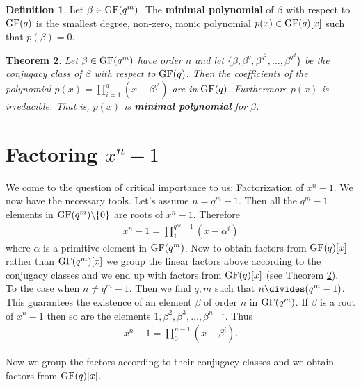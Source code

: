 \documentclass[12pt]{article}
\newtheorem{thm}{Theorem}
\theoremstyle{definition}
\newtheorem{defn}[thm]{Definition}
\newtheorem{exmp}[thm]{Example}
\begin{document}
\begin{defn}
Let $\beta\in\text{GF}(q^m)$. The \textbf{minimal polynomial} of $\beta$ with respect to $\text{GF}(q)$ is the smallest degree, non-zero, monic polynomial $p(x)\in\text{GF}(q)[x]$ such that $p(\beta)=0$.
\end{defn}

\vspace{0.1cm}
\begin{thm}
\label{Thm:MinimalPolyConjugacy}
Let $\beta\in\text{GF}(q^m)$ have order $n$ and let $\{\beta,\beta^q,\beta^{q^2},\ldots,\beta^{q^d}\}$ be the conjugacy class of $\beta$ with respect to $\text{GF}(q)$. Then the coefficients of the polynomial $p(x)=\prod_{i=1}^{d}(x-\beta^{q^i})$ are in $\text{GF}(q)$. Furthermore $p(x)$ is irreducible. That is, $p(x)$ is \textbf{minimal polynomial} for $\beta$.
\end{thm}


\section{Factoring $x^n-1$}
We come to the question of critical importance to us: Factorization of $x^n-1$. We now have the necessary tools. Let's assume $n=q^m-1.$ Then all the $q^m-1$ elements in $\text{GF}(q^m)\backslash\{0\}$ are roots of $x^n-1$. Therefore
\begin{align*}
x^n-1=\prod_{1}^{q^m-1}(x-\alpha^i)
\end{align*}
where $\alpha$ is a primitive element in $\text{GF}(q^m)$. Now to obtain factors from $\text{GF}(q)[x]$ rather than $\text{GF}(q^m)[x]$ we group the linear factors above according to the conjugacy classes and we end up with factors from $\text{GF}(q)[x]$ (see Theorem \ref{Thm:MinimalPolyConjugacy}).\\

To the case when $n\neq q^m-1$. Then we find $q,m$ such that $n\divides (q^m-1)$. This guarantees the existence of an element $\beta$ of order $n$ in $\text{GF}(q^m)$. If $\beta$ is a root of $x^n-1$ then so are the elements $1,\beta^2,\beta^3,\ldots,\beta^{n-1}$.
 Thus 
 \begin{align*}
 x^n-1=\prod_{0}^{n-1}(x-\beta^i).
 \end{align*}

Now we group the factors according to their conjugacy classes and we obtain factors from $\text{GF}(q)[x]$.

%
%
%
%




\end{document}
